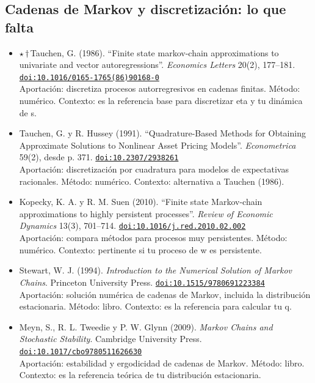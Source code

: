 \documentclass[11pt]{article}
\begin{document}
\subsection*{Cadenas de Markov y discretización: lo que falta}
\begin{itemize}
\item $\star$\,$\dagger$\,Tauchen, G. (1986). ``Finite state markov-chain approximations to univariate and vector autoregressions''. \textit{Economics Letters} 20(2), 177--181. \href{https://doi.org/10.1016/0165-1765(86)90168-0}{\texttt{doi:10.1016/0165-1765(86)90168-0}}\\
Aportación: discretiza procesos autorregresivos en cadenas finitas. Método: numérico. Contexto: es la referencia base para discretizar eta y tu dinámica de s.
\item Tauchen, G. y R. Hussey (1991). ``Quadrature-Based Methods for Obtaining Approximate Solutions to Nonlinear Asset Pricing Models''. \textit{Econometrica} 59(2), desde p. 371. \href{https://doi.org/10.2307/2938261}{\texttt{doi:10.2307/2938261}}\\
Aportación: discretización por cuadratura para modelos de expectativas racionales. Método: numérico. Contexto: alternativa a Tauchen (1986).
\item Kopecky, K. A. y R. M. Suen (2010). ``Finite state Markov-chain approximations to highly persistent processes''. \textit{Review of Economic Dynamics} 13(3), 701--714. \href{https://doi.org/10.1016/j.red.2010.02.002}{\texttt{doi:10.1016/j.red.2010.02.002}}\\
Aportación: compara métodos para procesos muy persistentes. Método: numérico. Contexto: pertinente si tu proceso de w es persistente.
\item Stewart, W. J. (1994). \textit{Introduction to the Numerical Solution of Markov Chains}. Princeton University Press. \href{https://doi.org/10.1515/9780691223384}{\texttt{doi:10.1515/9780691223384}}\\
Aportación: solución numérica de cadenas de Markov, incluida la distribución estacionaria. Método: libro. Contexto: es la referencia para calcular tu q.
\item Meyn, S., R. L. Tweedie y P. W. Glynn (2009). \textit{Markov Chains and Stochastic Stability}. Cambridge University Press. \href{https://doi.org/10.1017/cbo9780511626630}{\texttt{doi:10.1017/cbo9780511626630}}\\
Aportación: estabilidad y ergodicidad de cadenas de Markov. Método: libro. Contexto: es la referencia teórica de tu distribución estacionaria.
\end{itemize}
\end{document}
